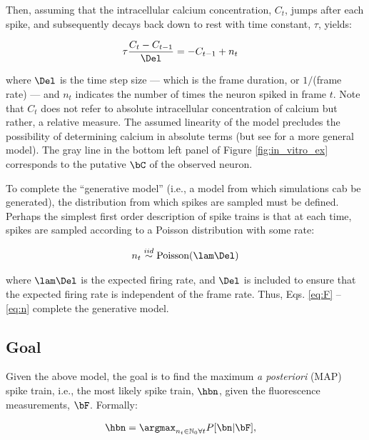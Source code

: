 Then, assuming that the intracellular calcium concentration, $C_t$, jumps after each spike, and subsequently decays back down to rest with time constant, $\tau$, yields:

\begin{align} \label{eq:C}
\tau \frac{C_t - C_{t-1}}{\Del} &= - C_{t-1} + n_t
\end{align}

\noindent where $\Del$ is the time step size --- which is the frame duration, or $1/$(frame rate) --- and $n_t$ indicates the number of times the neuron spiked in frame $t$. %
Note that $C_t$ does not refer to absolute intracellular concentration of calcium but rather, a relative measure.  The assumed linearity of the model precludes the possibility of determining calcium in absolute terms (but see \cite{VogelsteinPaninski09} for a more general model).  The gray line in the bottom left panel of Figure \ref{fig:in_vitro_ex} corresponds to the putative $\bC$ of the observed neuron.  

To complete the ``generative model'' (i.e., a model from which simulations cab be generated), the distribution from which spikes are sampled must be defined.  Perhaps the simplest first order description of spike trains is that at each time, spikes are sampled according to a Poisson distribution with some rate:

\begin{align} \label{eq:n}
	n_t \overset{iid}{\sim} \text{Poisson}(\lam \Del)
\end{align}

\noindent where $\lam \Del$ is the expected firing rate, and $\Del$ is included to ensure that the expected firing rate is independent of the frame rate.  Thus, Eqs. \eqref{eq:F} -- \eqref{eq:n} complete the generative model.  






\subsection{Goal} \label{sec:goal}

Given the above model, the goal is to find the maximum \emph{a posteriori} (MAP) spike train, i.e., the most likely spike train, $\hbn$,  given the fluorescence measurements, $\bF$. Formally:

\begin{align} \label{eq:nhat1} 
\hbn &=  \anx P[\bn | \bF], 
\end{align}

